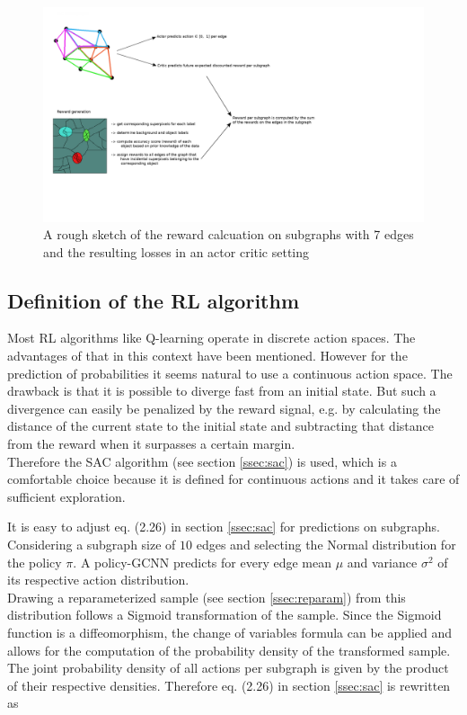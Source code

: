 \begin{figure}[ht!]
	\centering
	\includegraphics[width=1.5\textwidth]{figures/images/reward_calc_sketch.png}
	\caption{A rough sketch of the reward calcuation on subgraphs with 7 edges and the resulting losses in an actor critic setting}
	\label{reward_calc}
\end{figure}

\subsection{Definition of the RL algorithm}
Most RL algorithms like Q-learning operate in discrete action spaces. The advantages of that in this context have been mentioned. However for the prediction of probabilities it seems natural to use a continuous action space. The drawback is that it is possible to diverge fast from an initial state. But such a divergence can easily be penalized by the reward signal, e.g. by calculating the distance of the current state to the initial state and subtracting that distance from the reward when it surpasses a certain margin. \\
Therefore the SAC algorithm (see section \ref{ssec:sac}) is used, which is a comfortable choice because it is defined for continuous actions and it takes care of sufficient exploration. 

It is easy to adjust eq. (2.26) in section \ref{ssec:sac} for predictions on subgraphs. Considering a subgraph size of $10$ edges and selecting the Normal distribution for the policy $\pi$. A policy-GCNN predicts for every edge mean $\mu$ and variance $\sigma ^2$ of its respective action distribution. \\
Drawing a reparameterized sample (see section \ref{ssec:reparam}) from this distribution follows a Sigmoid transformation of the sample. Since the Sigmoid function is a diffeomorphism, the change of variables formula \cite{papamakarios2019normalizing} can be applied and allows for the computation of the probability density of the transformed sample. \\
The joint probability density of all actions per subgraph is given by the product of their respective densities. Therefore eq. (2.26) in section \ref{ssec:sac} is rewritten as

